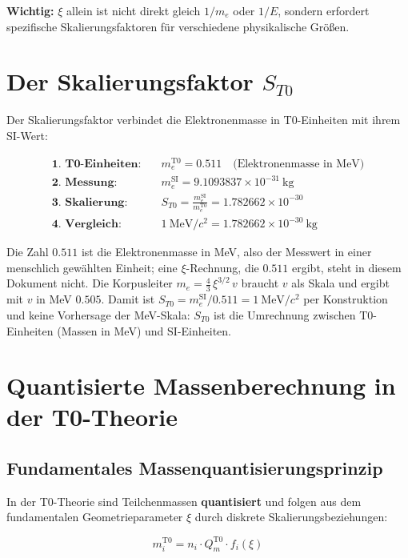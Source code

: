 	\textbf{Wichtig:} $\xi$ allein ist nicht direkt gleich $1/m_e$ oder $1/E$, sondern erfordert spezifische Skalierungsfaktoren für verschiedene physikalische Größen.
	
	\section{Der Skalierungsfaktor $S_{T0}$}
	\label{sec:scaling-derivation}
	
	Der Skalierungsfaktor verbindet die Elektronenmasse in T0-Einheiten mit ihrem SI-Wert:
	
\begin{align}
	\textbf{1. T0-Einheiten:} \quad & m_e^{\mathrm{T0}} = 0.511 \quad \text{(Elektronenmasse in MeV)} \\
	\textbf{2. Messung:} \quad & m_e^{\mathrm{SI}} = 9.1093837 \times 10^{-31}~\mathrm{kg} \\
	\textbf{3. Skalierung:} \quad & S_{T0} = \frac{m_e^{\mathrm{SI}}}{m_e^{\mathrm{T0}}} = 1.782662 \times 10^{-30} \\
	\textbf{4. Vergleich:} \quad & 1~\mathrm{MeV}/c^2 = 1.782662 \times 10^{-30}~\mathrm{kg}
\end{align}
	
	Die Zahl $0.511$ ist die Elektronenmasse in MeV, also der Messwert in einer menschlich gewählten Einheit; eine $\xi$-Rechnung, die $0.511$ ergibt, steht in diesem Dokument nicht. Die Korpusleiter $m_e = \frac43\,\xi^{3/2}\,v$ braucht $v$ als Skala und ergibt mit $v$ in MeV $0.505$. Damit ist $S_{T0} = m_e^{\mathrm{SI}}/0.511 = 1~\mathrm{MeV}/c^2$ per Konstruktion und keine Vorhersage der MeV-Skala: $S_{T0}$ ist die Umrechnung zwischen T0-Einheiten (Massen in MeV) und SI-Einheiten.
	
	\section{Quantisierte Massenberechnung in der T0-Theorie}
	
	\subsection{Fundamentales Massenquantisierungsprinzip}
	
	In der T0-Theorie sind Teilchenmassen \textbf{quantisiert} und folgen aus dem fundamentalen Geometrieparameter $\xi$ durch diskrete Skalierungsbeziehungen:
	
	\begin{equation}
		m_i^{\mathrm{T0}} = n_i \cdot Q_m^{\mathrm{T0}} \cdot f_i(\xi)
	\end{equation}
	

